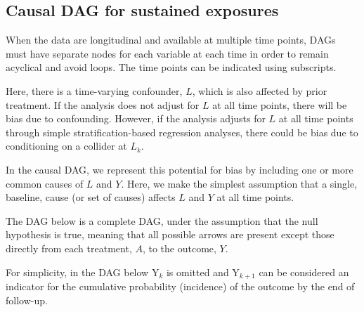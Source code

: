 \documentclass[a4paper]{report}
\begin{document}
\vspace{3mm}

\subsection{Causal DAG for sustained exposures}

When the data are longitudinal and available at multiple time points, DAGs must have separate nodes for each variable at each time in order to remain acyclical and avoid loops. The time points can be indicated using subscripts. 

Here, there is a time-varying confounder, $L$, which is also affected by prior treatment. If the analysis does not adjust for $L$ at all time points, there will be bias due to confounding. However, if the analysis adjusts for $L$ at all time points through simple stratification-based regression analyses, there could be bias due to conditioning on a collider at $L_k$. 

In the causal DAG, we represent this potential for bias by including one or more common causes of $L$ and $Y$. Here, we make the simplest assumption that a single, baseline, cause (or set of causes) affects $L$ and $Y$ at all time points.

The DAG below is a complete DAG, under the assumption that the null hypothesis is true, meaning that all possible arrows are present except those directly from each treatment, $A$, to the outcome, $Y$. 

For simplicity, in the DAG below Y$_k$ is omitted and Y$_{k+1}$ can be considered an indicator for the cumulative probability (incidence) of the outcome by the end of follow-up.
\newpage
\end{document}
